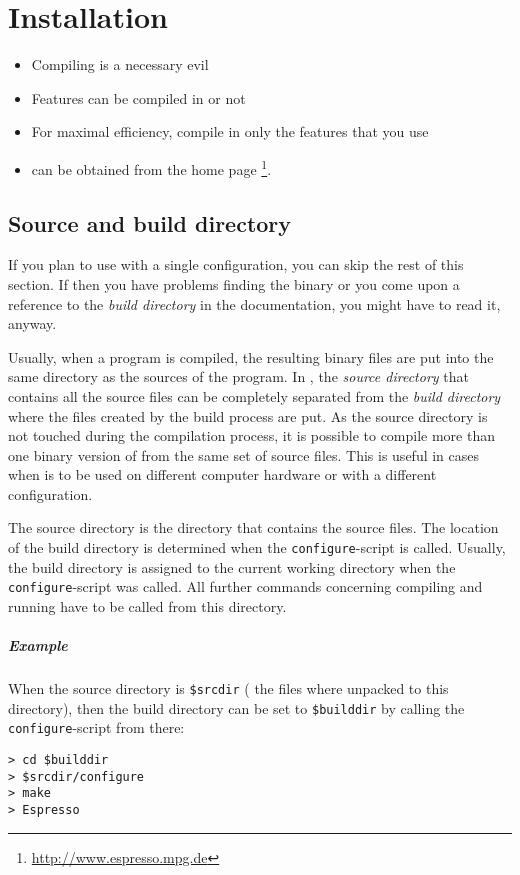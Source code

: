 \chapter{Installation}
\label{chap:install}

\begin{itemize}
\item Compiling \es{} is a necessary evil
\item Features can be compiled in or not
\item For maximal efficiency, compile in only the features that you
  use
\item \es{} can be obtained from the \es{} home page
  \footnote{\url{http://www.espresso.mpg.de}}.
\end{itemize}


\section{Source and build directory}
\label{sec:builddir}
 

If you plan to use \es{} with a single configuration, you can skip the
rest of this section. If then you have problems finding the \es{}
binary or you come upon a reference to the \emph{build directory} in
the documentation, you might have to read it, anyway. 

Usually, when a program is compiled, the resulting binary files are
put into the same directory as the sources of the program. In \es{},
the \emph{source directory} that contains all the source files can be
completely separated from the \emph{build directory} where the files
created by the build process are put. As the source directory is not
touched during the compilation process, it is possible to compile more
than one binary version of \es{} from the same set of source files.
This is useful in cases when \es{} is to be used on different computer
hardware or with a different configuration.

The source directory is the directory that contains the source files.
The location of the build directory is determined when the
\texttt{configure}-script is called.  Usually, the build directory is
assigned to the current working directory when the
\texttt{configure}-script was called. All further commands concerning
compiling and running \es{} have to be called from this directory.

\paragraph{Example}
When the source directory is \texttt{\$srcdir} (\ie{} the files where
unpacked to this directory), then the build directory can be set to
\texttt{\$builddir} by calling the \texttt{configure}-script from
there:
\begin{verbatim}
> cd $builddir
> $srcdir/configure
> make
> Espresso
\end{verbatim}

